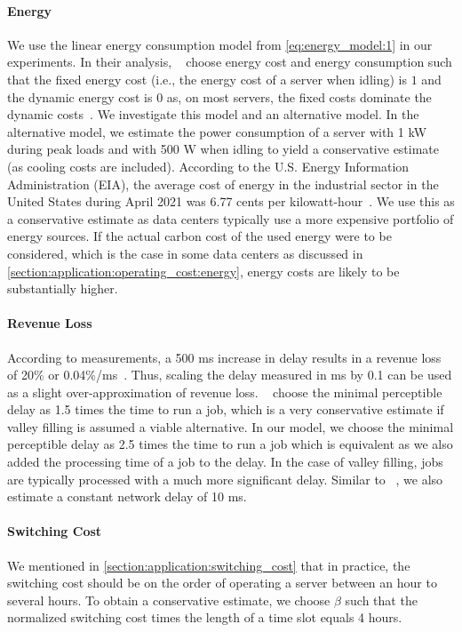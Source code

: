 \paragraph{Energy} We use the linear energy consumption model from \autoref{eq:energy_model:1} in our experiments. In their analysis, \citeauthor{Lin2011}~\cite{Lin2011} choose energy cost and energy consumption such that the fixed energy cost (i.e., the energy cost of a server when idling) is $1$ and the dynamic energy cost is $0$ as, on most servers, the fixed costs dominate the dynamic costs~\cite{Clark2005}. We investigate this model and an alternative model. In the alternative model, we estimate the power consumption of a server with 1 kW during peak loads and with 500 W when idling to yield a conservative estimate (as cooling costs are included). According to the U.S. Energy Information Administration (EIA), the average cost of energy in the industrial sector in the United States during April 2021 was 6.77 cents per kilowatt-hour~\cite{EIA2021}. We use this as a conservative estimate as data centers typically use a more expensive portfolio of energy sources. If the actual carbon cost of the used energy were to be considered, which is the case in some data centers as discussed in \cref{section:application:operating_cost:energy}, energy costs are likely to be substantially higher.

\paragraph{Revenue Loss} According to measurements, a 500 ms increase in delay results in a revenue loss of 20\% or 0.04\%/ms~\cite{Lin2012, Hamilton2009}. Thus, scaling the delay measured in ms by 0.1 can be used as a slight over-approximation of revenue loss. \citeauthor{Lin2011}~\cite{Lin2011} choose the minimal perceptible delay as 1.5 times the time to run a job, which is a very conservative estimate if valley filling is assumed a viable alternative. In our model, we choose the minimal perceptible delay as 2.5 times the time to run a job which is equivalent as we also added the processing time of a job to the delay. In the case of valley filling, jobs are typically processed with a much more significant delay. Similar to \citeauthor{Lin2012}~\cite{Lin2012}, we also estimate a constant network delay of 10 ms.

\paragraph{Switching Cost} We mentioned in \cref{section:application:switching_cost} that in practice, the switching cost should be on the order of operating a server between an hour to several hours. To obtain a conservative estimate, we choose $\beta$ such that the normalized switching cost times the length of a time slot equals 4 hours.

